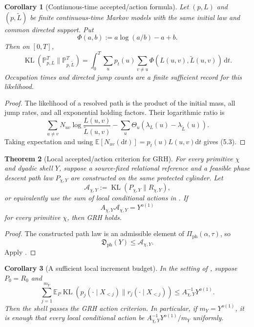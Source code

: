 \documentclass[11pt]{article}
\newtheorem{theorem}{Theorem}[section]
\newtheorem{corollary}[theorem]{Corollary}
\theoremstyle{definition}
\theoremstyle{remark}
\newcommand{\E}{\mathbb E}
\newcommand{\KL}{\operatorname{KL}}
\newcommand{\dd}{\mathrm d}
\newcommand{\Phase}{\mathrm{ph}}
\newcommand{\PhiRate}{\Phi}
\begin{document}
\begin{corollary}[Continuous-time accepted/action formula]
\label{cor:continuous-path-action}
Let $(p,L)$ and $(p,\widetilde L)$ be finite continuous-time Markov models with
the same initial law and common directed support.  Put
\[
 \PhiRate(a,b):=a\log(a/b)-a+b.
\]
Then on $[0,T]$,
\[
 \boxed{
 \KL(\mathbb P_{p,L}^T\|\mathbb P_{p,\widetilde L}^T)
 =\int_0^T\sum_up_t(u)
   \sum_{v\ne u}\PhiRate(L(u,v),\widetilde L(u,v))\,\dd t.}
 \tag{5.3}
\]
Occupation times and directed jump counts are a finite sufficient record for
this likelihood.
\end{corollary}

\begin{proof}
The likelihood of a resolved path is the product of the initial mass, all jump
rates, and all exponential holding factors.  Their logarithmic ratio is
\[
 \sum_{u\ne v}N_{uv}\log\frac{L(u,v)}{\widetilde L(u,v)}
 -\sum_u\Theta_u(\lambda_L(u)-\lambda_{\widetilde L}(u)).
\]
Taking expectation and using
$\E[N_{uv}(\dd t)]=p_t(u)L(u,v)\dd t$ gives \textup{(5.3)}.
\end{proof}

\begin{theorem}[Local accepted/action criterion for GRH]
\label{thm:local-action-GRH}
For every primitive $\chi$ and dyadic shell $Y$, suppose a source-fixed
relational reference and a feasible phase descent path law $P_{\chi,Y}$ are
constructed on the same protected cylinder.  Let
\[
 \mathcal A_{\chi,Y}
 :=\KL(P_{\chi,Y}\|R_{\chi,Y}),
 \tag{5.4}
\]
or equivalently use the sum of local conditional actions in
.  If
\[
 \boxed{
 A_{\chi,Y}\mathcal A_{\chi,Y}=Y^{o(1)}}
 \tag{5.5}
\]
for every primitive $\chi$, then GRH holds.
\end{theorem}

\begin{proof}
The constructed path law is an admissible element of
$\Pi_{\Phase}(\alpha,\tau)$, so
\[
 \mathfrak D_{\Phase}(Y)
 \le\mathcal A_{\chi,Y}.
\]
Apply .
\end{proof}

\begin{corollary}[A sufficient local increment budget]
\label{cor:local-increment-budget}
In the setting of , suppose $P_0=R_0$ and
\[
 \sum_{j=1}^{m_Y}
 \E_P\KL(p_j(\cdot\mid X_{<j})\|r_j(\cdot\mid X_{<j}))
 \le A_{\chi,Y}^{-1}Y^{o(1)}.
 \tag{5.6}
\]
Then the shell passes the GRH action criterion.  In particular, if
$m_Y=Y^{o(1)}$, it is enough that every local conditional action be
$A_{\chi,Y}^{-1}Y^{o(1)}/m_Y$ uniformly.
\end{corollary}
\end{document}
